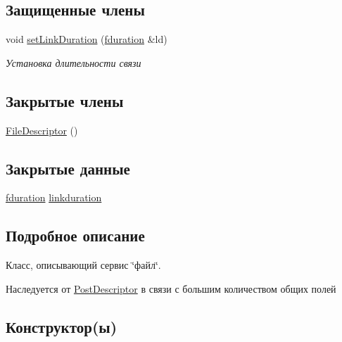\subsection*{Защищенные члены}
\begin{DoxyCompactItemize}
\item 
void \hyperlink{class_network_service_1_1_file_descriptor_a2f280462647a42806033a39da3f55528}{set\+Link\+Duration} (\hyperlink{networkservice_8h_a476cc728ef971cba9111c75ea41a760a}{fduration} \&ld)
\begin{DoxyCompactList}\small\item\em Установка длительности связи \end{DoxyCompactList}\end{DoxyCompactItemize}
\subsection*{Закрытые члены}
\begin{DoxyCompactItemize}
\item 
\hyperlink{class_network_service_1_1_file_descriptor_addaf36ba62b80d5a50f6fee2c4d02965}{File\+Descriptor} ()
\end{DoxyCompactItemize}
\subsection*{Закрытые данные}
\begin{DoxyCompactItemize}
\item 
\hyperlink{networkservice_8h_a476cc728ef971cba9111c75ea41a760a}{fduration} \hyperlink{class_network_service_1_1_file_descriptor_a1ce56aef66c93f0a6a5eebc8d43c4bb8}{linkduration}
\end{DoxyCompactItemize}


\subsection{Подробное описание}
Класс, описывающий сервис \char`\"{}файл\char`\"{}. 

Наследуется от \hyperlink{class_network_service_1_1_post_descriptor}{Post\+Descriptor} в связи с большим количеством общих полей 

\subsection{Конструктор(ы)}
\hypertarget{class_network_service_1_1_file_descriptor_addaf36ba62b80d5a50f6fee2c4d02965}{}
